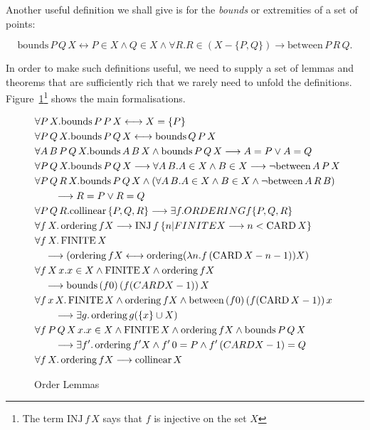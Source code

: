 \documentclass{article}
\DeclareMathOperator{\CARD}{CARD}
\DeclareMathOperator{\FINITE}{FINITE}
\DeclareMathOperator{\ordering}{ordering}
\newcommand{\collinear}[1]{\text{collinear}\,#1}
\newcommand{\bounds}[3]{\text{bounds}\,#1\,#2\,#3}
\newcommand{\between}[3]{\text{between}\,#1\,#2\,#3}
\renewcommand{\implies}{\longrightarrow}
\renewcommand{\iff}{\longleftrightarrow}
\begin{document}
Another useful definition we shall give is for the \emph{bounds} or extremities of a set of points:

\begin{displaymath}
\bounds{P}{Q}{X} \iff P \in X \wedge Q \in X \wedge \forall R. R\in (X - \{P,Q\}) \implies \between{P}{R}{Q}.
\end{displaymath}

In order to make such definitions useful, we need to supply a set of lemmas and theorems that are sufficiently rich that we rarely need to unfold the definitions. Figure~\ref{fig:OrderLemmas}\footnote{The term $\text{INJ}\,f\,X$ says that $f$ is injective on the set $X$} shows the main formalisations.

\begin{figure}\label{fig:OrderLemmas}
\begin{align}
&\forall P\,X. \bounds{P}{P}{X} \iff X = \{P\}\\
&\forall P\,Q\,X. \bounds{P}{Q}{X} \iff \bounds{Q}{P}{X}\\
&\forall A\,B\,P\,Q\,X. \bounds{A}{B}{X} \wedge \bounds{P}{Q}{X} \implies A = P \vee A = Q\\
&\forall P\,Q\,X. \bounds{P}{Q}{X} \implies \forall A\,B. A \in X \wedge B \in X \implies \neg\between{A}{P}{X}\\
&\forall P\,Q\,R\,X. \bounds{P}{Q}{X} \wedge (\forall A\,B. A \in X \wedge B \in X \wedge \neg\between{A}{R}{B})\notag\\
&\qquad\implies R = P \vee R = Q\\
&\forall P\,Q\,R. \collinear \{P,Q,R\} \implies \exists f. ORDERING f \{P,Q,R\}\\
&\forall f\,X. \ordering{f}{X} \implies \text{INJ}\,f\,\{ n \vert FINITE X \implies n < \CARD X \}\\
&\forall f\,X. \FINITE X \label{eq:OrderRev}\\
&\quad\implies (\ordering{f}{X} \iff \ordering (\lambda n. f\,(\CARD X - n - 1)) X)\\
&\forall f\,X\,x. x \in X \wedge \FINITE X \wedge \ordering{f}{X}\label{eq:OrderBounds}\\
&\quad\implies \bounds{(f 0)}{(f (CARD X - 1))}{X}\\
&\forall f\,x\,X. \FINITE X \wedge \ordering{f}{X} \wedge \between{(f 0)}{(f (\CARD X - 1))}{x}\notag\\
&\qquad \implies \exists g. \ordering{g}{(\{x\} \cup X)}\label{eq:OrderExtend}\\
&\forall f\,P\,Q\,X\,x. x \in X \wedge \FINITE X \wedge \ordering{f}{X} \wedge \bounds{P}{Q}{X}\notag\\
&\qquad\implies\exists f'. \ordering{f'}{X} \wedge f'\,0 = P \wedge f'\,(CARD X - 1) = Q\label{eq:ChooseOrder}\\
&\forall f\,X. \ordering{f}{X} \implies \collinear X
\end{align}
\caption{Order Lemmas}
\end{figure}
\end{document}
